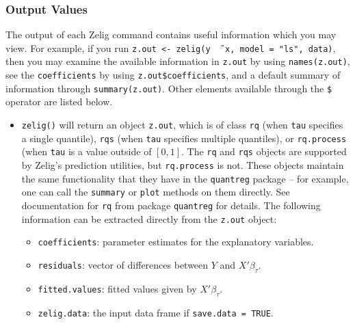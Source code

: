 \subsubsection{Output Values}

The output of each Zelig command contains useful information which you
may view.  For example, if you run \texttt{z.out <- zelig(y \~\,
  x, model = "ls", data)}, then you may examine the available
information in \texttt{z.out} by using \texttt{names(z.out)},
see the {\tt coefficients} by using {\tt z.out\$coefficients}, and
a default summary of information through \texttt{summary(z.out)}.
Other elements available through the {\tt \$} operator are listed
below.

\begin{itemize}
  \item {\tt zelig()} will return an object {\tt z.out}, which is of class 
    {\tt rq} (when {\tt tau} specifies a single quantile), {\tt rqs} (when {\tt tau}
    specifies multiple quantiles), or {\tt rq.process} (when {\tt tau} is a value
    outside of $[0,1]$. The {\tt rq} and {\tt rqs} objects are supported by Zelig's
    prediction utilities, but {\tt rq.process} is not. These objects maintain the
    same functionality that they have in the {\tt quantreg} package -- for example,
    one can call the {\tt summary} or {\tt plot} methods on them directly.
    See documentation for {\tt rq} from package {\tt quantreg} for details.
    The following information can be extracted directly from the {\tt z.out}
    object:
   \begin{itemize}
   \item {\tt coefficients}: parameter estimates for the explanatory
     variables.
   \item {\tt residuals}: vector of differences between $Y$ and $X'\beta_\tau$.
   \item {\tt fitted.values}: fitted values given by $X'\beta_\tau$.
   \item {\tt zelig.data}: the input data frame if {\tt save.data = TRUE}.  
   \end{itemize}
  

\end{itemize}
